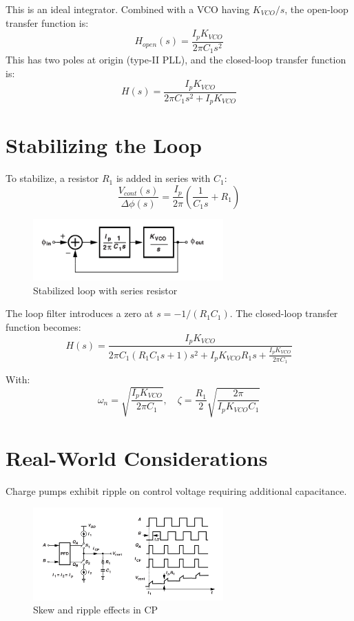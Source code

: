 \documentclass[12pt]{article}
\begin{document}
This is an ideal integrator. Combined with a VCO having $K_{VCO}/s$, the open-loop transfer function is:
\[
H_{open}(s) = \frac{I_p K_{VCO}}{2\pi C_1 s^2}
\]
This has two poles at origin (type-II PLL), and the closed-loop transfer function is:
\[
H(s) = \frac{I_p K_{VCO}}{2\pi C_1 s^2 + I_p K_{VCO}}
\]

\section{Stabilizing the Loop}
To stabilize, a resistor $R_1$ is added in series with $C_1$:
\[
\frac{V_{cont}(s)}{\Delta \phi(s)} = \frac{I_p}{2\pi} \left( \frac{1}{C_1 s} + R_1 \right)
\]

\begin{figure}[H]
    \centering
    \includegraphics[width=0.65\textwidth]{figs/cp5}
    \caption{Stabilized loop with series resistor}
\end{figure}

The loop filter introduces a zero at $s = -1/(R_1 C_1)$. The closed-loop transfer function becomes:
\[
H(s) = \frac{I_p K_{VCO}}{2\pi C_1 (R_1 C_1 s + 1) s^2 + I_p K_{VCO} R_1 s + \frac{I_p K_{VCO}}{2\pi C_1}}
\]

With:
\[
\omega_n = \sqrt{\frac{I_p K_{VCO}}{2\pi C_1}}, \quad \zeta = \frac{R_1}{2} \sqrt{\frac{2\pi}{I_p K_{VCO} C_1}}
\]

\section{Real-World Considerations}
Charge pumps exhibit ripple on control voltage requiring additional capacitance.

\begin{figure}[H]
    \centering
    \includegraphics[width=0.65\textwidth]{figs/cp6}
    \caption{Skew and ripple effects in CP}
\end{figure}
\end{document}
